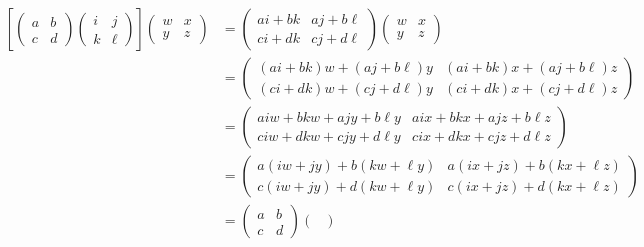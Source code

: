 \begin{sol}
    \begin{align*}
        \left[
        \begin{pmatrix}
            a & b \\
            c & d
        \end{pmatrix}
        \begin{pmatrix}
            i & j \\
            k & \ell
        \end{pmatrix}
        \right]
        \begin{pmatrix}
            w & x \\
            y & z
        \end{pmatrix} & = 
        \begin{pmatrix}
            ai + bk & aj +b\ell \\
            ci + dk & cj + d\ell
        \end{pmatrix}
        \begin{pmatrix}
            w & x \\
            y & z
        \end{pmatrix} \\
        & = 
        \begin{pmatrix}
            (ai+ bk)w + (aj+b\ell)y & (ai + bk)x + (aj + b\ell)z \\
            (ci + dk)w + (cj + d\ell)y & (ci + dk)x + (cj + d\ell)z
        \end{pmatrix} \\
        & = 
        \begin{pmatrix}
            aiw + bkw + ajy + b\ell y & aix + bkx + ajz + b\ell z \\
            ciw + dkw + cjy + d\ell y & cix + dkx + cjz + d\ell z
        \end{pmatrix} \\
        & = 
        \begin{pmatrix}
            a(iw + jy) + b(kw + \ell y) & a(ix + jz) + b(kx + \ell z) \\
            c(iw + jy) + d(kw + \ell y) & c(ix + jz) + d(kx + \ell z)
        \end{pmatrix} \\
        & = 
        \begin{pmatrix}
            a & b \\
            c & d
        \end{pmatrix}
        \begin{pmatrix}

\end{pmatrix}
\end{align*}
\end{sol}
